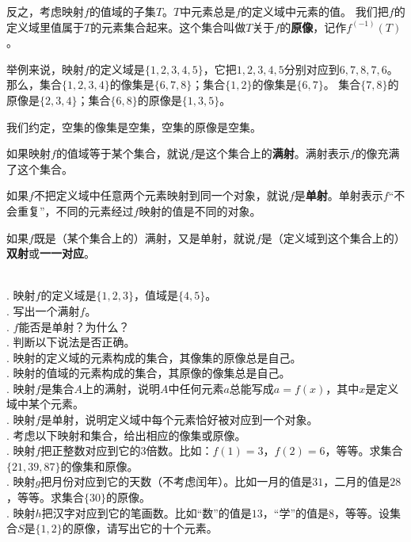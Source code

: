 \documentclass[12pt,UTF8,fontset=none]{ctexbook}
\begin{document}
反之，考虑映射$f$的值域的子集$T$。$T$中元素总是$f$的定义域中元素的值。
我们把$f$的定义域里值属于$T$的元素集合起来。这个集合叫做$T$关于$f$的\textbf{原像}，记作$f^{(-1)}(T)$。

举例来说，映射$f$的定义域是$\{1,2,3,4,5\}$，它把$1,2,3,4,5$分别对应到$6,7,8,7,6$。
那么，集合$\{1,2,3,4\}$的像集是$\{6,7,8\}$；集合$\{1,2\}$的像集是$\{6,7\}$。
集合$\{7,8\}$的原像是$\{2,3,4\}$；集合$\{6,8\}$的原像是$\{1,3,5\}$。

我们约定，空集的像集是空集，空集的原像是空集。

如果映射$f$的值域等于某个集合，就说$f$是这个集合上的\textbf{满射}。满射表示$f$的像充满了这个集合。

如果$f$不把定义域中任意两个元素映射到同一个对象，就说$f$是\textbf{单射}。单射表示$f$“不会重复”，不同的元素经过$f$映射的值是不同的对象。

如果$f$既是（某个集合上的）满射，又是单射，就说$f$是（定义域到这个集合上的）\textbf{双射}或\textbf{一一对应}。

\begin{xt}\label{xt:2-2-0}
    \mbox{} \\
    . 映射$f$的定义域是$\{1,2,3\}$，值域是$\{4,5\}$。\\
    . 写出一个满射$f$。\\
    . $f$能否是单射？为什么？\\
    . 判断以下说法是否正确。\\
    . 映射的定义域的元素构成的集合，其像集的原像总是自己。\\
    . 映射的值域的元素构成的集合，其原像的像集总是自己。\\
    . 映射$f$是集合$A$上的满射，说明$A$中任何元素$a$总能写成$a = f(x)$，其中$x$是定义域中某个元素。\\
    . 映射$f$是单射，说明定义域中每个元素恰好被对应到一个对象。\\ 
    . 考虑以下映射和集合，给出相应的像集或原像。\\
    . 映射$f$把正整数对应到它的$3$倍数。比如：$f(1) = 3$，$f(2) = 6$，等等。求集合$\{21, 39, 87\}$的像集和原像。\\
    . 映射$g$把月份对应到它的天数（不考虑闰年）。比如一月的值是$31$，二月的值是$28$，等等。求集合$\{30\}$的原像。\\
    . 映射$h$把汉字对应到它的笔画数。比如“数”的值是$13$，“学”的值是$8$，等等。设集合$S$是$\{1,2\}$的原像，请写出它的十个元素。 %
\end{xt}
\end{document}
